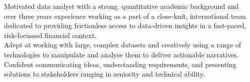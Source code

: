 \vspace{2ex}

\begin{center}
Motivated data analyst with a strong, quantitative academic background and over three years experience working as a part of a close-knit, international team dedicated to providing frictionless access to data-driven insights in a fast-paced, risk-focussed financial context.
\\
\vspace{1ex} 
Adept at working with large, complex datasets and creatively using a range of technologies to manipulate and analyse them to deliver actionable narratives. Confident communicating ideas, understanding requirements, and presenting solutions to stakeholders ranging in seniority and technical ability.
\end{center}